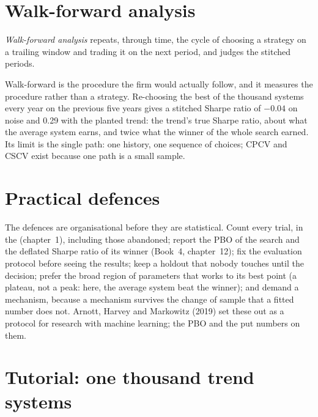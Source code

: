 \section{Walk-forward analysis}

\begin{definition}\label{def:rs:overfitting:walkforward}
\emph{Walk-forward analysis} repeats, through time, the cycle of choosing a strategy on a trailing window and trading it on the
next period, and judges the stitched  periods.
\end{definition}

Walk-forward is the procedure the firm would actually follow, and it measures the procedure rather than a strategy. Re-choosing the best of the thousand
systems every year on the previous five years gives a stitched Sharpe ratio of $-0.04$ on noise and 0.29 with the planted trend: the trend's true Sharpe ratio,
about what the average system earns, and twice what the  winner of the whole search earned. Its limit is the single path: one history, one sequence of
choices; CPCV and CSCV exist because one path is a small sample.

\section{Practical defences}

The defences are organisational before they are statistical. Count every trial, in the  (chapter~1), including those abandoned; report the PBO of the
search and the deflated Sharpe ratio of its winner (Book~4, chapter~12); fix the evaluation protocol before seeing the results; keep a holdout that nobody touches
until the decision; prefer the broad region of parameters that works to its best point (a plateau, not a peak: here, the average system beat the winner); and
demand a mechanism, because a mechanism survives the change of sample that a fitted number does not. Arnott, Harvey and Markowitz (2019) set these out as a
protocol for research with machine learning; the PBO and the  put numbers on them.

\section{Tutorial: one thousand trend systems}\label{tut:rs:overfitting:tut}

